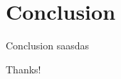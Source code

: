 \documentclass{beamer}
\begin{document}
\section{Conclusion}
\begin{frame}{Conclusion}
saasdas
\end{frame}

\begin{frame}{}
\begin{center}
{\Huge Thanks!}
\end{center}
\end{frame}
\end{document}
